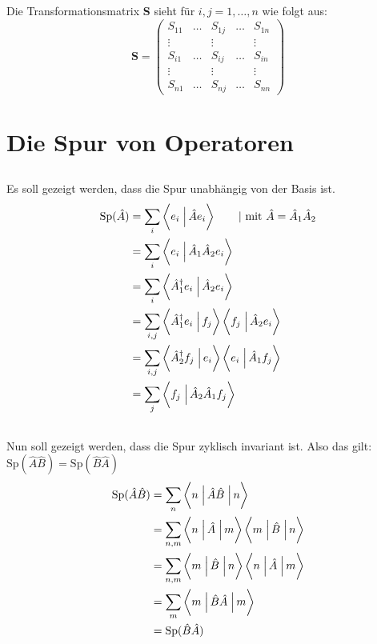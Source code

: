 \subsection{}

    Die Transformationsmatrix \textbf{S} sieht für $i,j = 1, \dots, n$ wie folgt aus:
    \[
        \textbf{S} =
        \begin{pmatrix}
            S_{11} & \dots & S_{1j} & \dots & S_{1n} \\
            \vdots && \vdots && \vdots \\
            S_{i1} & \dots & S_{ij} & \dots & S_{in} \\
            \vdots && \vdots && \vdots \\
            S_{n1} & \dots & S_{nj} & \dots & S_{nn}
        \end{pmatrix}
    \]

\section{Die Spur von Operatoren}
\subsection{}
Es soll gezeigt werden, dass die Spur unabhängig von der Basis ist.
\begin{align*}
    \text{Sp}(\hat A) &= \sum_i \braket{e_i}{\hat Ae_i} \qquad|\text{ mit } \hat A=\hat A_1\hat A_2 \\
                      &= \sum_i \braket{e_i}{\hat A_1\hat A_2e_i} \\
                      &= \sum_i \braket{\hat A_1^\dagger e_i}{\hat A_2e_i} \\
                      &= \sum_{i,j} \braket{\hat A_1^\dagger e_i}{ f_j } \braket{f_j}{\hat A_2e_i} \\
                      &= \sum_{i,j}\braket{\hat A_2^\dagger f_j}{e_i} \braket{e_i}{\hat A_1f_j} \\
                      &= \sum_j \braket{f_j}{\hat A_2\hat A_1f_j} \\
\end{align*}

\subsection{}
Nun soll gezeigt werden, dass die Spur zyklisch invariant ist.
Also das gilt: $\text{Sp}(\hat A\hat B) = \text{Sp}(\hat B\hat A)$
\begin{align*}
    \text{Sp}(\hat A\hat B) &= \sum_n \braopket{n}{\hat A\hat B}{n} \\
                           &= \sum_{n,m} \braopket{n}{\hat A}{m} \braopket{m}{\hat B}{n} \\
                           &= \sum_{n,m} \braopket{m}{\hat B}{n}\braopket{n}{\hat A}{m} \\
                           &= \sum_m \braopket{m}{\hat B\hat A}{m} \\
                           &=\text{Sp}(\hat B\hat A)
\end{align*}


